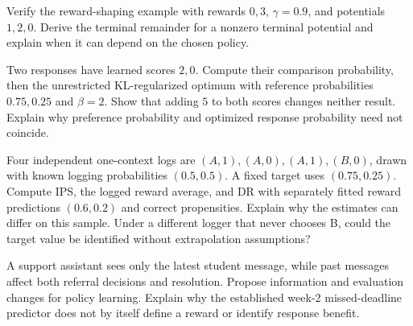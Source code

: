 \begin{exercises}
\item {}Verify the reward-shaping example with rewards $0,3$, $\gamma=0.9$, and potentials $1,2,0$. Derive the terminal remainder for a nonzero terminal potential and explain when it can depend on the chosen policy.
\item {}Two responses have learned scores $2,0$. Compute their comparison probability, then the unrestricted KL-regularized optimum with reference probabilities $0.75,0.25$ and $\beta=2$. Show that adding $5$ to both scores changes neither result. Explain why preference probability and optimized response probability need not coincide.
\item {}Four independent one-context logs are $(A,1),(A,0),(A,1),(B,0)$, drawn with known logging probabilities $(0.5,0.5)$. A fixed target uses $(0.75,0.25)$. Compute IPS, the logged reward average, and DR with separately fitted reward predictions $(0.6,0.2)$ and correct propensities. Explain why the estimates can differ on this sample. Under a different logger that never chooses B, could the target value be identified without extrapolation assumptions?
\item {}A support assistant sees only the latest student message, while past messages affect both referral decisions and resolution. Propose information and evaluation changes for policy learning. Explain why the established week-2 missed-deadline predictor does not by itself define a reward or identify response benefit.
\end{exercises}

